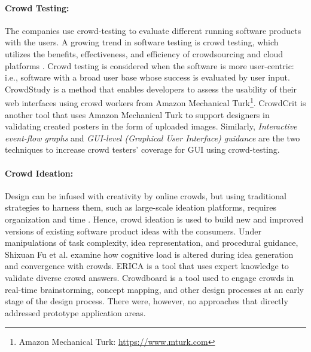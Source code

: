 \paragraph{Crowd Testing:}
The companies use crowd-testing to evaluate different running software products with the users.
A growing trend in software testing is crowd testing, which utilizes the benefits, effectiveness, and efficiency of crowdsourcing and cloud platforms \cite{article:crowdsourcing:latoza}.
Crowd testing is considered when the software is more user-centric: i.e., software with a broad user base whose success is evaluated by user input.
CrowdStudy \cite{article:crowdsourcing:nebeling} is a method that enables developers to assess the usability of their web interfaces using crowd workers from Amazon Mechanical Turk\footnote{Amazon Mechanical Turk: \url{https://www.mturk.com}}.
CrowdCrit \cite{article:crowdsourcing:luther} is another tool that uses Amazon Mechanical Turk to support designers in validating created posters in the form of uploaded images.
Similarly, \textit{Interactive event-flow graphs} and \textit{GUI-level (Graphical User Interface) guidance} \cite{article:crowdsourcing:chen} are the two techniques to increase crowd testers' coverage for GUI using crowd-testing.

\paragraph{Crowd Ideation:}
Design can be infused with creativity by online crowds, but using traditional strategies to harness them, such as large-scale ideation platforms, requires organization and time \cite{article:crowdsourcing:andolina}.
Hence, crowd ideation is used to build new and improved versions of existing software product ideas with the consumers.
Under manipulations of task complexity, idea representation, and procedural guidance, Shixuan Fu et al. \cite{article:crowdsourcing:fu} examine how cognitive load is altered during idea generation and convergence with crowds.
ERICA \cite{article:crowdsourcing:erica} is a tool that uses expert knowledge to validate diverse crowd answers.
Crowdboard \cite{article:crowdsourcing:andolina} is a tool used to engage crowds in real-time brainstorming, concept mapping, and other design processes at an early stage of the design process.
There were, however, no approaches that directly addressed prototype application areas.

\clearpage
